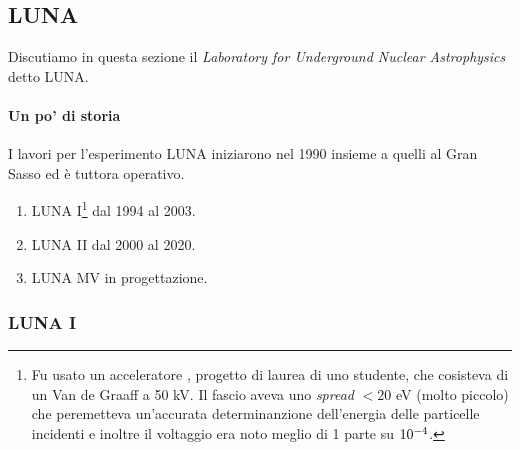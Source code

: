 \subsection{LUNA}\label{sec-LUNA}
Discutiamo in questa sezione il \textit{Laboratory for Underground Nuclear Astrophysics} detto LUNA.

\paragraph{Un po' di storia} 
I lavori per l'esperimento LUNA iniziarono nel 1990 insieme a quelli al Gran Sasso ed è tuttora operativo.
\begin{enumerate}
	\item LUNA I\footnote{Fu usato un acceleratore \textit{}, progetto di laurea di uno studente, che cosisteva di un Van de Graaff a 50 kV. Il fascio aveva uno \textit{spread} $<20$ eV (molto piccolo) che peremetteva un'accurata determinanzione dell'energia delle particelle incidenti e inoltre il voltaggio era noto meglio di 1 parte su $10^{-4}$.} dal 1994 al 2003.
	\item LUNA II dal 2000 al 2020.
	\item LUNA MV in progettazione.
\end{enumerate}

\subsubsection{LUNA I}\label{sec-LUNA-I}
